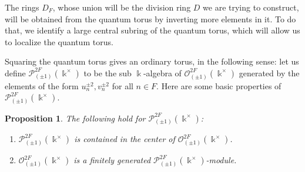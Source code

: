 \documentclass{amsart}
\newtheorem{prop}[equation]{Proposition}
\theoremstyle{definition}
\renewcommand{\k}{\Bbbk}
\numberwithin{equation}{section}
\begin{document}
The rings $D_F$, whose union will be the division ring $D$ we are trying to construct, will be obtained from the quantum torus by inverting more elements in it. To do that, we identify a large central subring of the quantum torus, which will allow us to localize the quantum torus.

Squaring the quantum torus gives an ordinary torus, in the following sense: let us define $\mathcal{P}^{2F}_{(\pm 1)}(\k^{\times})$ to be the sub $\k$-algebra of $\mathcal{O}^{2F}_{(\pm 1)}(\k^{\times})$ generated by the elements of the form $u_n^{\pm 2}, v_n^{\pm 2}$ for all $n \in F$.
Here are some basic properties of $\mathcal{P}^{2F}_{(\pm 1)}(\k^{\times})$.

\begin{prop}\label{prop:square-torus}
The following hold for $\mathcal{P}^{2F}_{(\pm 1)}(\k^{\times})$:
\begin{enumerate}
\item $\mathcal{P}^{2F}_{(\pm 1)}(\k^{\times})$ is contained in the center of $\mathcal{O}^{2F}_{(\pm 1)}(\k^{\times})$.
\item $\mathcal{O}^{2F}_{(\pm 1)}(\k^{\times})$ is a finitely generated  $\mathcal{P}^{2F}_{(\pm 1)}(\k^{\times})$-module.
\end{enumerate}
\end{prop}
\end{document}
